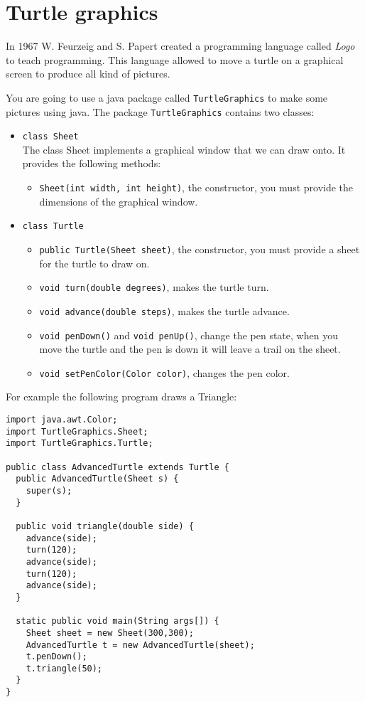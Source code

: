 \documentclass{exercices}
\renewcommand{\|}{\url|}
\begin{document}
\section{Turtle graphics}
In 1967 W. Feurzeig and S. Papert created a programming language called \emph{Logo} to teach programming.
This language allowed to move a turtle on a graphical screen to produce all kind of pictures.

You are going to use a java package called \verb!TurtleGraphics! to make some pictures using java.
The package \verb!TurtleGraphics! contains two classes:
\begin{itemize}
  \item \verb!class Sheet! \\
  The class Sheet implements a graphical window that we can draw onto.
  It provides the following methods:
  \begin{itemize}
    \item \verb!Sheet(int width, int height)!, the constructor, you must provide the dimensions of the graphical window.
  \end{itemize}
  \item \verb!class Turtle! \\
  \begin{itemize}
    \item \verb!public Turtle(Sheet sheet)!, the constructor, you must provide a sheet for the turtle to draw on.
    \item \verb!void turn(double degrees)!, makes the turtle turn.
    \item \verb!void advance(double steps)!, makes the turtle advance.
    \item \verb!void penDown()! and \verb!void penUp()!, change the pen state, when you move the turtle and the pen is down it will leave a trail on the sheet.
    \item \verb!void setPenColor(Color color)!, changes the pen color.
  \end{itemize}
\end{itemize}

For example the following program draws a Triangle:
\begin{verbatim}
import java.awt.Color;
import TurtleGraphics.Sheet;
import TurtleGraphics.Turtle;

public class AdvancedTurtle extends Turtle {
  public AdvancedTurtle(Sheet s) {
    super(s);
  }

  public void triangle(double side) {
    advance(side);
    turn(120);
    advance(side);
    turn(120);
    advance(side);
  }

  static public void main(String args[]) {
    Sheet sheet = new Sheet(300,300);
    AdvancedTurtle t = new AdvancedTurtle(sheet);
    t.penDown();
    t.triangle(50);
  }
}
\end{verbatim}
\end{document}
